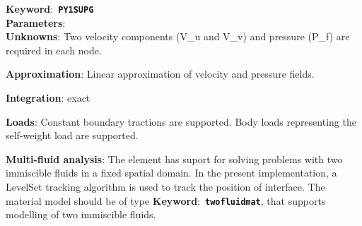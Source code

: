 \documentclass[a4paper]{article}
\newcommand{\descitem}[1]{{\noindent \bf #1}:}
\newcommand{\elemkeyword}[1]{\descitem{Keyword}~{\bf \texttt{#1}}}
\begin{document}
\elemkeyword{PY1SUPG}\\
\descitem{Parameters} \\
\descitem{Unknowns}
Two velocity components (V\_u and V\_v) and pressure (P\_f) are required in each node.

\descitem{Approximation} Linear approximation of velocity and pressure
fields.

\descitem{Integration}
exact

\descitem{Loads} Constant boundary tractions are supported. Body loads
representing the self-weight load are supported.

\descitem{Multi-fluid analysis} The element has suport for solving
problems with two immiscible fluids in
a fixed spatial domain. In the present implementation, a LevelSet tracking algorithm
is used to track the position of interface. 
The material model should be of type \elemkeyword{twofluidmat}, that
supports modelling of two immiscible fluids.
\end{document}
